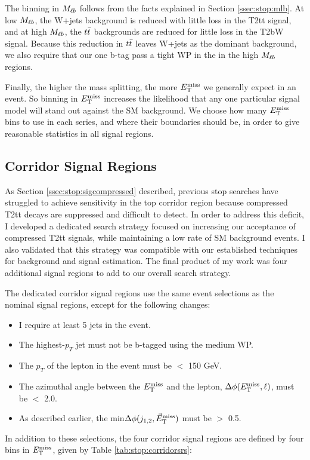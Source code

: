 The binning in $M_{\ell b}$ follows from the facts explained in
Section \ref{ssec:stop:mlb}. At low $M_{\ell b}$, the W+jets
background is reduced with little loss in the T2tt signal, and at high
$M_{\ell b}$, the $t\bar{t}$ backgrounds are reduced for little loss in
the T2bW signal. Because this reduction in $t\bar{t}$ leaves W+jets as
the dominant background, we also require that our one b-tag pass a
tight WP in the in the high $M_{\ell b}$ regions.

Finally, the higher the mass splitting, the more $E_\text{T}^\text{miss}$ we generally
expect in an event. So binning in $E_\text{T}^\text{miss}$ increases the
likelihood that any one particular signal model will stand out against the
SM background. We choose how many $E_\text{T}^\text{miss}$ bins to use in each series,
and where their boundaries should be, in order to give reasonable
statistics in all signal regions.

\subsection{Corridor Signal Regions}
\label{ssec:stop:sigregscorridor}

As Section \ref{ssec:stop:sigcompressed} described, previous stop
searches have struggled to achieve sensitivity in the top corridor
region because compressed T2tt decays are suppressed and difficult to
detect. In order to address this deficit, I developed a dedicated
search strategy focused on increasing our acceptance of compressed
T2tt signals, while maintaining a low rate of SM background
events. I also validated that this strategy was compatible with our
established techniques for background and signal estimation. The final
product of my work was four additional signal
regions to add to our overall search strategy.

The dedicated corridor signal regions use the same event selections as
the nominal signal regions, except for the following changes:
\begin{itemize}
\item I require at least 5 jets in the event.
\item The highest-$p_T$ jet must not be b-tagged using the medium WP.
\item The $p_T$ of the lepton in the event must be $<$ 150 GeV.
\item The azimuthal angle between the $E_\text{T}^\text{miss}$ and the lepton, $\Delta
  \phi (E_\text{T}^\text{miss}, \ell)$, must be $<$ 2.0.
\item As described earlier, the min$\Delta \phi(j_{1,2},\vec{E}_\text{T}^\text{miss})$
  must be $>$ 0.5.
\end{itemize}
In addition to these selections, the four corridor signal regions are
defined by four bins in $E_\text{T}^\text{miss}$, given by Table \ref{tab:stop:corridorsrs}:

